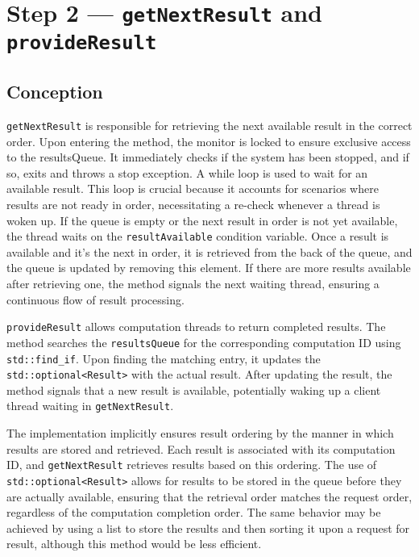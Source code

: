\documentclass{article}
\begin{document}
    \pagebreak

    \section*{Step 2 --- \texttt{getNextResult} and \texttt{provideResult}}
    \subsection*{Conception}

    \texttt{getNextResult} is responsible for retrieving the next available result in the correct order.
    Upon entering the method, the monitor is locked to ensure exclusive access to the resultsQueue.
    It immediately checks if the system has been stopped, and if so, exits and throws a stop exception.
    A while loop is used to wait for an available result.
    This loop is crucial because it accounts for scenarios where results are not ready in order, necessitating a re-check whenever a thread is woken up.
    If the queue is empty or the next result in order is not yet available, the thread waits on the \texttt{resultAvailable} condition variable.
    Once a result is available and it's the next in order, it is retrieved from the back of the queue, and the queue is updated by removing this element.
    If there are more results available after retrieving one, the method signals the next waiting thread, ensuring a continuous flow of result processing.

    \texttt{provideResult} allows computation threads to return completed results.
    The method searches the \texttt{resultsQueue} for the corresponding computation ID using \texttt{std::find\_if}.
    Upon finding the matching entry, it updates the \texttt{std::optional<Result>} with the actual result.
    After updating the result, the method signals that a new result is available, potentially waking up a client thread waiting in \texttt{getNextResult}.

    The implementation implicitly ensures result ordering by the manner in which results are stored and retrieved.
    Each result is associated with its computation ID, and \texttt{getNextResult} retrieves results based on this ordering.
    The use of \texttt{std::optional<Result>} allows for results to be stored in the queue before they are actually available, ensuring that the retrieval order matches the request order, regardless of the computation completion order.
    The same behavior may be achieved by using a list to store the results and then sorting it upon a request for result, although this method would be less efficient.
\end{document}
